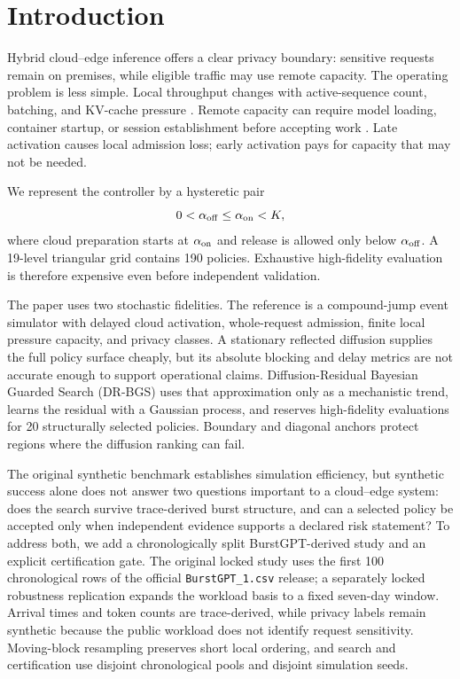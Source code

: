 \documentclass[preprint,12pt]{elsarticle}
\begin{document}
\section{Introduction}
\label{sec:intro}

Hybrid cloud--edge inference offers a clear privacy boundary: sensitive requests remain on premises, while eligible traffic may use remote capacity. The operating problem is less simple. Local throughput changes with active-sequence count, batching, and KV-cache pressure \cite{kwon2023pagedattention,patel2024splitwise,zhong2024distserve,agrawal2024sarathi}. Remote capacity can require model loading, container startup, or session establishment before accepting work \cite{serverlessllm2024}. Late activation causes local admission loss; early activation pays for capacity that may not be needed.

We represent the controller by a hysteretic pair
\[
0<\alpha_{\rm off}\le \alpha_{\rm on}<K,
\]
where cloud preparation starts at $\alpha_{\rm on}$ and release is allowed only below $\alpha_{\rm off}$. A 19-level triangular grid contains 190 policies. Exhaustive high-fidelity evaluation is therefore expensive even before independent validation.

The paper uses two stochastic fidelities. The reference is a compound-jump event simulator with delayed cloud activation, whole-request admission, finite local pressure capacity, and privacy classes. A stationary reflected diffusion supplies the full policy surface cheaply, but its absolute blocking and delay metrics are not accurate enough to support operational claims. Diffusion-Residual Bayesian Guarded Search (DR-BGS) uses that approximation only as a mechanistic trend, learns the residual with a Gaussian process, and reserves high-fidelity evaluations for 20 structurally selected policies. Boundary and diagonal anchors protect regions where the diffusion ranking can fail.

The original synthetic benchmark establishes simulation efficiency, but synthetic success alone does not answer two questions important to a cloud--edge system: does the search survive trace-derived burst structure, and can a selected policy be accepted only when independent evidence supports a declared risk statement? To address both, we add a chronologically split BurstGPT-derived study and an explicit certification gate. The original locked study uses the first 100 chronological rows of the official \texttt{BurstGPT\_1.csv} release; a separately locked robustness replication expands the workload basis to a fixed seven-day window. Arrival times and token counts are trace-derived, while privacy labels remain synthetic because the public workload does not identify request sensitivity. Moving-block resampling preserves short local ordering, and search and certification use disjoint chronological pools and disjoint simulation seeds.
\end{document}
